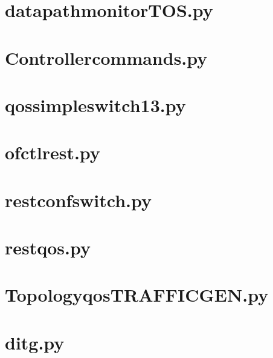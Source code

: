 \documentclass[12pt, a4paper, twoside, openright]{ociamthesis}  %
\begin{document}
\section{datapath\textunderscore monitor\textunderscore TOS.py}\label{datapath_monitor_TOS}

\section{Controller\textunderscore commands.py}\label{Controller_commands}

\section{qos\textunderscore simple\textunderscore switch\textunderscore 13.py}\label{qos_simple_switch_13}

\section{ofctl\textunderscore rest.py}\label{ofctl_rest}

\section{rest\textunderscore conf\textunderscore switch.py}\label{rest_conf_switch}

\section{rest\textunderscore qos.py}\label{rest_qos}

\section{Topology\textunderscore qos\textunderscore TRAFFIC\textunderscore GEN.py}\label{Topology}

\section{ditg.py}\label{ditg}

\end{document}
